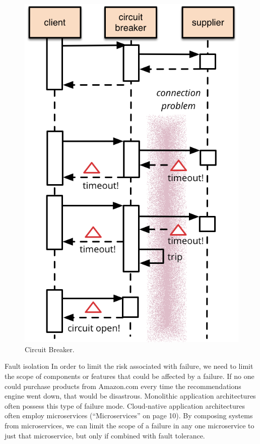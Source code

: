 \begin{figure}
  \includegraphics[width=\linewidth]{src/images/03-capitulo-3/circuit_breaker.png}
  \caption{Circuit Breaker.}
  \label{fig:circuit_breaker}
\end{figure}

Fault isolation
In order to limit the risk associated with failure, we need to limit the scope of components or features that could be affected by a failure. If no one could purchase products from Amazon.com every time the recommendations engine went down,
that would be disastrous. Monolithic application architectures often possess this type of failure mode. Cloud-native application architectures often employ microservices (“Microservices” on page 10). By composing systems from microservices, we can limit the scope of a failure in any one microservice to just that microservice, but only if combined with fault tolerance.\cite[p.~3]{stin2015}

